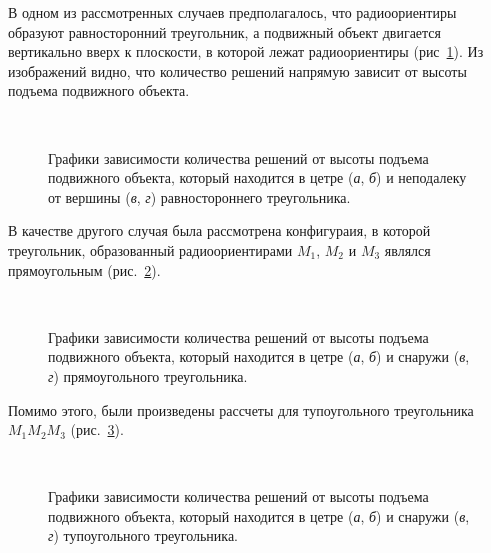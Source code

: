 \documentclass[../main.tex]{subfiles}
\begin{document}
В одном из рассмотренных случаев предполагалось, что радиоориентиры образуют равносторонний треугольник, а подвижный объект двигается вертикально вверх к плоскости, в которой лежат радиоориентиры (рис~\ref{fig:tetrahedron:pic3}). Из изображений видно, что количество решений напрямую зависит от высоты подъема подвижного объекта.

\begin{figure}[htpb]
  \centering
  \qquad
  \\
  \qquad

  \caption{Графики зависимости количества решений от высоты подъема подвижного объекта, который находится в цетре (\textit{а}, \textit{б}) и неподалеку от вершины (\textit{в}, \textit{г}) равностороннего треугольника.}
  \label{fig:tetrahedron:pic3}
\end{figure}

В качестве другого случая была рассмотрена конфигураия, в которой треугольник, образованный радиоориентирами $M_1$, $M_2$ и $M_3$ являлся прямоугольным (рис.~\ref{fig:tetrahedron:pic4}).

\begin{figure}[htpb]
  \centering
  \qquad
  \\
  \qquad

  \caption{Графики зависимости количества решений от высоты подъема подвижного объекта, который находится в цетре (\textit{а}, \textit{б}) и снаружи (\textit{в}, \textit{г}) прямоугольного треугольника.}
  \label{fig:tetrahedron:pic4}
\end{figure}

Помимо этого, были произведены рассчеты для тупоугольного треугольника $M_1M_2M_3$ (рис.~\ref{fig:tetrahedron:pic5}).

\begin{figure}[htpb]
  \centering
  \qquad
  \\
  \qquad

  \caption{Графики зависимости количества решений от высоты подъема подвижного объекта, который находится в цетре (\textit{а}, \textit{б}) и снаружи (\textit{в}, \textit{г}) тупоугольного треугольника.}
  \label{fig:tetrahedron:pic5}
\end{figure}
\end{document}
